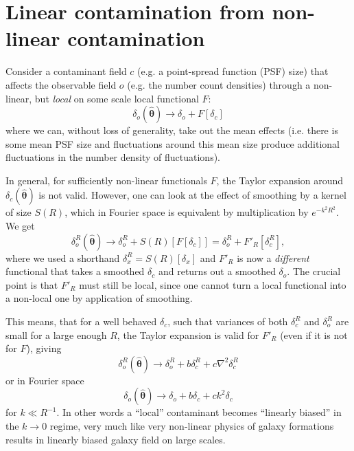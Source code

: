 \documentclass[usenatbib]{mnrasb}
\newcommand{\nv}{\hat{\boldsymbol{\theta}}}
\begin{document}
  \section{Linear contamination from non-linear contamination} \label{app:lincont}
    Consider a contaminant field $c$ (e.g. a point-spread function (PSF) size) that affects the observable field $o$ (e.g. the number count densities) through a non-linear, but \emph{local} on some scale local functional $F$:
    \begin{equation}
      \delta_o(\nv) \rightarrow \delta_o + F [ \delta_c ]
    \end{equation}
    where we can, without loss of generality, take out the mean effects (i.e. there is some mean PSF size and fluctuations around this mean size produce additional fluctuations in the number density of fluctuations).

    In general, for sufficiently non-linear functionals $F$, the Taylor expansion around $\delta_c(\nv)$ is not valid. However, one can look at the effect of smoothing by a kernel of size $S(R)$, which in Fourier space is equivalent by multiplication by $e^{-k^2R^2}$. We get
    \begin{equation}
      \delta^R_o(\nv) \rightarrow \delta^R_o  + S(R)[F [ \delta_c  ]] =  \delta^R_o + F'_R [ \delta^R_c ],
    \end{equation}
    where we used a shorthand $\delta_x^R=S(R)[\delta_x]$ and  $F'_R$ is now a \emph{different} functional that takes a smoothed $\delta_c$ and returns out a smoothed $\delta_o$.  The crucial point is that $F'_R$ must still be local, since one cannot turn a local functional into a non-local one by application of smoothing.

    This means, that for a well behaved $\delta_c$, such that variances of both $\delta^R_c$ and $\delta^R_o$ are small for a large enough $R$, the Taylor expansion is valid for $F'_R$ (even if it is not for $F$), giving
    \begin{equation}
      \delta^R_o(\nv) \rightarrow \delta^R_o  + b \delta^R_c + c \nabla^2 \delta^R_c
    \end{equation}
    or in Fourier space
    \begin{equation}
      \delta_o(\nv) \rightarrow \delta_o  + b \delta_c + c k^2 \delta_c
    \end{equation}
    for $k\ll R^{-1}$. In other words a ``local'' contaminant becomes ``linearly biased'' in the $k\rightarrow 0 $ regime, very much like very non-linear physics of galaxy formations results in linearly biased galaxy field on large scales.
\end{document}

